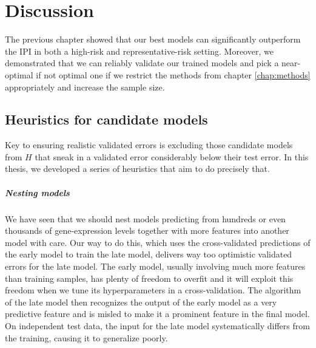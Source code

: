 \chapter{Discussion} \label{chap:discussion}

The previous chapter showed that our best models can significantly outperform the IPI in both 
a high-risk and representative-risk setting. Moreover, we demonstrated that we can reliably validate 
our trained models and pick a near-optimal if not optimal one if we restrict the methods from 
chapter \ref{chap:methods} appropriately and increase the sample size.

\section{Heuristics for candidate models}

Key to ensuring realistic validated errors is excluding those candidate models from $H$ that sneak 
in a validated error considerably below their test error. In this thesis, we developed a series 
of heuristics that aim to do precisely that.

\paragraph{Nesting models}
We have seen that we should nest models predicting from hundreds or even thousands of 
gene-expression levels together with more features into another model with care. Our way to do 
this, which uses the cross-validated predictions of the early model to train the late model, 
delivers way too optimistic validated errors for the late model. The early model, usually involving 
much more features than training samples, has plenty of freedom to overfit and it will exploit this 
freedom when we tune its hyperparameters in a cross-validation. The algorithm of the late model then 
recognizes the output of the early model as a very predictive feature and is misled to make it 
a prominent feature in the final model. On independent test data, the input for the late model 
systematically differs from the training, causing it to generalize poorly.

